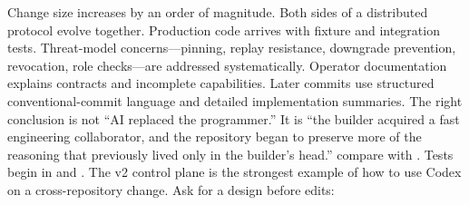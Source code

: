 Change size increases by an order of magnitude.\markdownRendererOlItemEnd 
{}Both sides of a distributed protocol evolve together.\markdownRendererOlItemEnd 
{}Production code arrives with fixture and integration tests.\markdownRendererOlItemEnd 
{}Threat-model concerns—pinning, replay resistance, downgrade prevention,\markdownRendererSoftLineBreak
{}revocation, role checks—are addressed systematically.\markdownRendererOlItemEnd 
{}Operator documentation explains contracts and incomplete capabilities.\markdownRendererOlItemEnd 
{}Later commits use structured conventional-commit language and detailed\markdownRendererSoftLineBreak
{}implementation summaries.\markdownRendererOlItemEnd 
\markdownRendererOlEnd \markdownRendererInterblockSeparator
{}The right conclusion is not “AI replaced the programmer.” It is “the builder\markdownRendererSoftLineBreak
{}acquired a fast engineering collaborator, and the repository began to preserve\markdownRendererSoftLineBreak
{}more of the reasoning that previously lived only in the builder's head.”\markdownRendererInterblockSeparator
{}\markdownRendererThematicBreak{}\markdownRendererInterblockSeparator
{}
\markdownRendererSectionEnd 
\markdownRendererSectionEnd \markdownRendererSectionBegin
{}\markdownRendererInterblockSeparator
{}\markdownRendererBlockQuoteBegin
{} compare  with . Tests begin in  and .\markdownRendererBlockQuoteEnd \markdownRendererInterblockSeparator
{}The v2 control plane is the strongest example of how to use Codex on a\markdownRendererSoftLineBreak
{}cross-repository change.\markdownRendererInterblockSeparator
{}\markdownRendererSectionBegin
{}\markdownRendererInterblockSeparator
{}Ask for a design before edits:\markdownRendererInterblockSeparator
{}\markdownRendererInterblockSeparator
